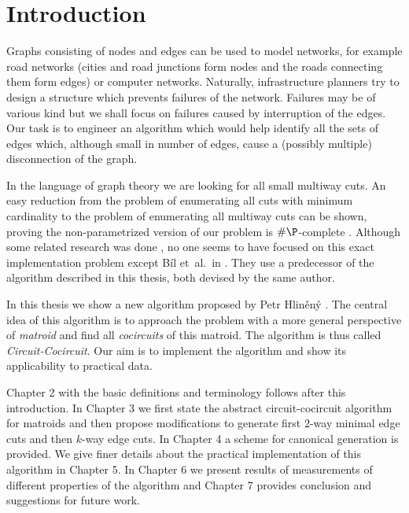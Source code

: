
\chapter{Introduction}

Graphs consisting of nodes and edges can be used to model networks, for example road networks (cities and road junctions form nodes and the roads connecting them form edges) or computer networks. Naturally, infrastructure planners try to design a structure which prevents failures of the network. Failures may be of various kind but we shall focus on failures caused by interruption of the edges. Our task is to engineer an algorithm which would help identify all the sets of edges which, although small in number of edges, cause a (possibly multiple) disconnection of the graph.

In the language of graph theory we are looking for all small multiway cuts. An easy reduction from the problem of enumerating all cuts with minimum cardinality to the problem of enumerating all multiway cuts can be shown, proving the non-parametrized version of our problem is $\#\P$-complete \cite{Provan1983}. Although some related research was done \cite{cactus}, no one seems to have focused on this exact implementation problem except Bíl et~al.\ in \cite{cdv}. They use a predecessor of the algorithm described in this thesis, both devised by the same author.

In this thesis we show a new algorithm proposed by Petr Hliněný \cite{hlineny_circuitcocircuit}. The central idea of this algorithm is to approach the problem with a more general perspective of \textit{matroid} and find all \textit{cocircuits} of this matroid. The algorithm is thus called \textit{Circuit-Cocircuit}. Our aim is to implement the algorithm and show its applicability to practical data.

Chapter 2 with the basic definitions and terminology follows after this introduction. In Chapter 3 we first state the abstract circuit-cocircuit algorithm for matroids and then propose modifications to generate first $2$-way minimal edge cuts and then $k$-way edge cuts. In Chapter 4 a scheme for canonical generation is provided. We give finer details about the practical implementation of this algorithm in Chapter 5. In Chapter 6 we present results of measurements of different properties of the algorithm and Chapter 7 provides conclusion and suggestions for future work.

